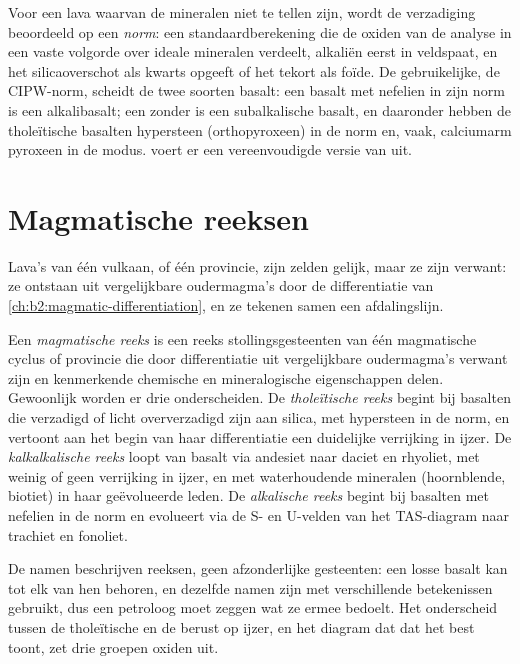 Voor een lava waarvan de mineralen niet te tellen zijn, wordt de verzadiging beoordeeld op een \emph{norm}: een
standaardberekening die de oxiden van de analyse in een vaste volgorde over ideale mineralen
verdeelt, alkaliën eerst in veldspaat, en het silicaoverschot als
kwarts opgeeft of het tekort als foïde. De gebruikelijke, de CIPW-norm, scheidt de
twee soorten basalt: een basalt met nefelien in zijn norm is een alkalibasalt; een
zonder is een subalkalische basalt, en daaronder hebben de tholeïtische basalten
hypersteen (orthopyroxeen) in de norm en, vaak, calciumarm pyroxeen in de modus.
 voert er een vereenvoudigde versie van uit.

\section{Magmatische reeksen}\label{sec:b2:magmatic-series:series}

Lava's van één vulkaan, of één provincie, zijn zelden gelijk, maar ze zijn verwant: ze
ontstaan uit vergelijkbare oudermagma's door de differentiatie van
\cref{ch:b2:magmatic-differentiation}, en ze tekenen samen een afdalingslijn.

\begin{definition}\label{def:b2:magmatic-series:series}
Een \emph{magmatische reeks} is een reeks stollingsgesteenten van één
magmatische cyclus of provincie die door differentiatie uit vergelijkbare oudermagma's verwant zijn
en kenmerkende chemische en mineralogische eigenschappen delen. Gewoonlijk worden er drie
onderscheiden. De \emph{tholeïtische reeks} begint bij
basalten die verzadigd of licht oververzadigd zijn aan silica, met hypersteen in de norm,
en vertoont aan het begin van haar differentiatie een duidelijke verrijking in ijzer. De
\emph{kalkalkalische reeks} loopt van basalt via
andesiet naar daciet en rhyoliet, met weinig of geen verrijking in ijzer, en met
waterhoudende mineralen (hoornblende, biotiet) in haar geëvolueerde leden. De \emph{alkalische
reeks} begint bij basalten met nefelien in de norm en evolueert
via de S- en U-velden van het TAS-diagram naar trachiet en fonoliet.
\end{definition}

De namen beschrijven reeksen, geen afzonderlijke gesteenten: een losse basalt kan tot elk van
hen behoren, en dezelfde namen zijn met verschillende betekenissen gebruikt, dus een petroloog
moet zeggen wat ze ermee bedoelt. Het onderscheid tussen de tholeïtische en de
 berust op ijzer, en het diagram dat dat het best toont, zet drie
groepen oxiden uit.

